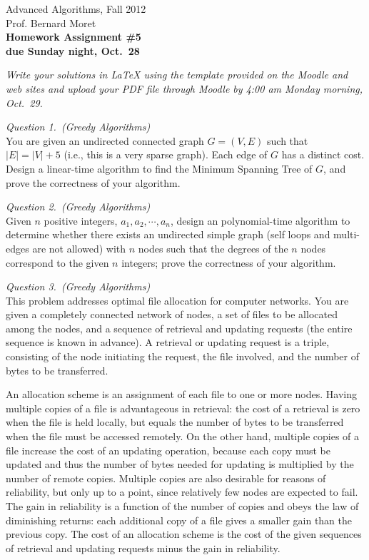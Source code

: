 \documentclass[11pt]{article}
\begin{document}
  \thispagestyle{empty}

\begin{center}
  \Large\sf Advanced Algorithms, Fall 2012\\
  
  \medskip
  \large\sf Prof. Bernard Moret\\

  \medskip\bigskip
  \Large\bf Homework Assignment \#5\\

  \smallskip
  \normalsize\rm due Sunday night, Oct.\ 28
\end{center}

\bigskip\rm\noindent
\textit{Write your solutions in LaTeX using the template provided on the
Moodle and web sites and upload your PDF file through Moodle by 4:00 am
Monday morning, Oct.\ 29.}


\bigskip\rm\noindent
\emph{Question 1.~(Greedy Algorithms)}\\
You are given an undirected connected graph $G=(V, E)$ such that $|E| = |V| +
5$ (i.e., this is a very sparse graph).  Each edge of $G$ has a distinct cost.
Design a linear-time algorithm to find the Minimum Spanning Tree of $G$, and
prove the correctness of your algorithm.

\bigskip\rm\noindent
\emph{Question 2.~(Greedy Algorithms)}\\
Given $n$ positive integers, $a_1, a_2,\cdots, a_n$, design an polynomial-time
algorithm to determine whether there exists an undirected simple graph
(self loops and multi-edges are not allowed) with $n$ nodes such that
the degrees of the $n$ nodes correspond to the given $n$ integers; prove the
correctness of your algorithm.

\bigskip\rm\noindent
\emph{Question 3.~(Greedy Algorithms)}\\
This problem addresses optimal file allocation for computer networks.  You are
given a completely connected network of nodes, a set of files to be allocated
among the nodes, and a sequence of retrieval and updating requests (the entire
sequence is known in advance).  A retrieval or updating request is a triple,
consisting of the node initiating the request, the file involved, and the
number of bytes to be transferred.
  
An allocation scheme is an assignment of each file to one or more nodes.
Having multiple copies of a file is advantageous in retrieval: the cost of a
retrieval is zero when the file is held locally, but equals the number of bytes
to be transferred when the file must be accessed remotely.  On the other hand,
multiple copies of a file increase the cost of an updating operation, because
each copy must be updated and thus the number of bytes needed for updating is
multiplied by the number of remote copies.  Multiple copies are also desirable
for reasons of reliability, but only up to a point, since relatively few nodes
are expected to fail.  The gain in reliability is a function of the number of
copies and obeys the law of diminishing returns: each additional copy of a file
gives a smaller gain than the previous copy.  The cost of an allocation scheme
is the cost of the given sequences of retrieval and updating requests minus the
gain in reliability.
\end{document}
